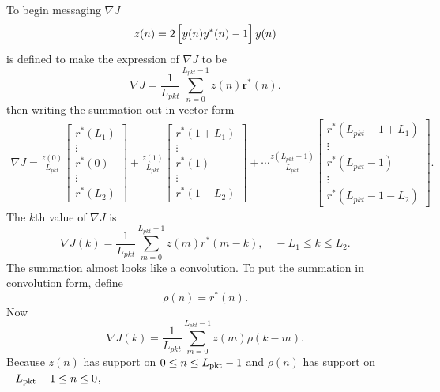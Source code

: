 To begin messaging $\nabla J$ 
\begin{equation}
z(n) = 	2\left[ \vphantom{\displaystyle\sum}  y(n) y^\ast(n) - 1 \right] y(n)
\end{equation} 
is defined to make the expression of $\nabla J$ to be
\begin{equation}
	\nabla J = \frac{1}{L_{pkt}} \sum_{n=0}^{L_{pkt}-1}
	z(n)  \mathbf{r}^\ast(n).
\label{eq:DelJcma-midMassage}
\end{equation}
then writing the summation out in vector form
\begin{multline}
\nabla J
	= 
	\frac{z(0)}{L_{pkt}}
		\begin{bmatrix} r^\ast(L_1) \\ \vdots \\ r^\ast(0) \\ \vdots \\ r^\ast(L_2) \end{bmatrix} +
	\frac{z(1)}{L_{pkt}}
		\begin{bmatrix} r^\ast(1+L_1) \\ \vdots \\ r^\ast(1) \\ \vdots \\ r^\ast(1-L_2) \end{bmatrix} + \cdots
	\frac{z(L_{pkt}-1)}{L_{pkt}}
		\begin{bmatrix} r^\ast(L_{pkt}-1+L_1) \\ \vdots \\ r^\ast(L_{pkt}-1) \\ \vdots \\ r^\ast(L_{pkt}-1-L_2) \end{bmatrix}
\label{eq:delJ_writeoutr}.
\end{multline}
The $k$th value of $\nabla J$ is
\begin{equation}
\nabla J(k) = \frac{1}{L_{pkt}} \sum^{L_{pkt}-1}_{m=0}  z(m) r^\ast(m-k), \quad -L_1 \leq k \leq L_2.
\end{equation}
The summation almost looks like a convolution.
To put the summation in convolution form, define
\begin{equation}
\rho(n) = r^\ast(n).
\end{equation}
Now
\begin{equation}
\nabla J(k) = \frac{1}{L_{pkt}} \sum^{L_{pkt}-1}_{m=0}  z(m) \rho(k-m).
\label{eq:CMA_delJ_rice_reformed}
\end{equation}
Because $z(n)$ has support on $0 \leq n \leq L_\text{pkt}-1$ and 
$\rho(n)$ has support on $-L_\text{pkt}+1 \leq n \leq 0$, 
